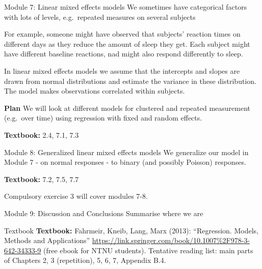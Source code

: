\documentclass[
  ignorenonframetext,
]{beamer}
\begin{document}
\begin{frame}
\begin{block}{Module 7: Linear mixed effects models}
\protect\hypertarget{module-7-linear-mixed-effects-models}{}
We sometimes have categorical factors with lots of levels, e.g.~repeated
measures on several subjects

For example, someone might have observed that subjects' reaction times
on different days as they reduce the amount of sleep they get. Each
subject might have different baseline reactions, nad might also respond
differently to sleep.

In linear mixed effects models we assume that the intercepts and slopes
are drawn from normal distributions and estimate the variance in these
distribution. The model makes observations correlated within subjects.

\textbf{Plan} We will look at different models for clustered and
repeated measurement (e.g.~over time) using regression with fixed and
random effects.

\textbf{Textbook:} 2.4, 7.1, 7.3
\end{block}
\end{frame}

\begin{frame}
\begin{block}{Module 8: Generalized linear mixed effects models}
\protect\hypertarget{module-8-generalized-linear-mixed-effects-models}{}
We generalize our model in Module 7 - on normal responses - to binary
(and possibly Poisson) responses.

\textbf{Textbook:} 7.2, 7.5, 7.7

Compulsory exercise 3 will cover modules 7-8.
\end{block}
\end{frame}

\begin{frame}
\begin{block}{Module 9: Discussion and Conclusions}
\protect\hypertarget{module-9-discussion-and-conclusions}{}
Summarise where we are
\end{block}
\end{frame}

\begin{frame}{Textbook}
\protect\hypertarget{textbook}{}
\textbf{Textbook:} Fahrmeir, Kneib, Lang, Marx (2013): ``Regression.
Models, Methods and Applications''
\url{https://link.springer.com/book/10.1007\%2F978-3-642-34333-9} (free
ebook for NTNU students). Tentative reading list: main parts of Chapters
2, 3 (repetition), 5, 6, 7, Appendix B.4.
\end{frame}
\end{document}

